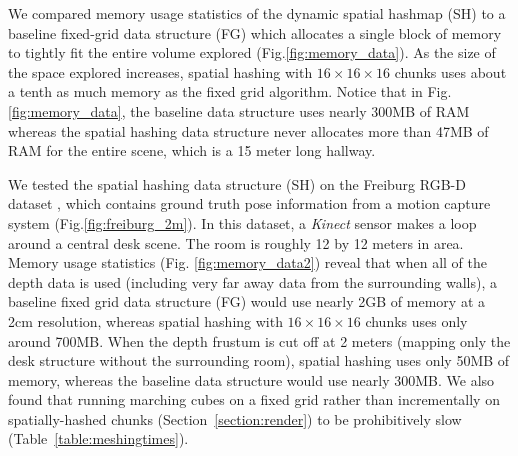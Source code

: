 \documentclass[conference]{IEEEtran}
\newcommand{\sref}[1]{Section~\ref{#1}}
\newcommand{\figref}[1]{Fig.\ref{#1}}
\newcommand{\tabref}[1]{Table~\ref{#1}}
\newcommand{\naive}{baseline\xspace}
\begin{document}
We compared memory usage statistics of the dynamic spatial hashmap (SH) to
a \naive fixed-grid data structure (FG) which allocates a single block of memory to
tightly fit the entire volume explored (\figref{fig:memory_data}). As the size of the space
explored increases,  spatial hashing  with $16 \times 16 \times
16$ chunks uses about a tenth as much memory as the fixed grid algorithm. Notice
that in \figref{fig:memory_data}, the \naive data structure uses nearly 300MB of RAM 
whereas the spatial hashing data structure never allocates more than 47MB of RAM
for the entire scene, which is a 15 meter long hallway.

We tested the spatial hashing data structure (SH) on the Freiburg
RGB-D dataset \cite{FREIBURG}, which contains ground truth pose information from a motion
capture system (\figref{fig:freiburg_2m}). In this dataset, a
\textit{Kinect} sensor makes a loop around a central desk scene. The room is
roughly 12 by 12 meters in area.  Memory usage statistics (Fig.
\ref{fig:memory_data2}) reveal that when all of the depth data is used
(including very far away data from the surrounding walls), a \naive fixed grid
data structure (FG) would use nearly 2GB of memory at a 2cm resolution, whereas
spatial hashing with $16 \times 16 \times 16$ chunks uses only around 700MB.
When the depth frustum is cut off at 2 meters (mapping only the desk structure
without the surrounding room), spatial hashing uses only 50MB of memory, whereas
the \naive data structure would use nearly 300MB. We also found that running marching
cubes on a fixed grid rather than incrementally on spatially-hashed chunks
(\sref{section:render}) to be prohibitively slow (\tabref{table:meshingtimes}). 

\end{document}
